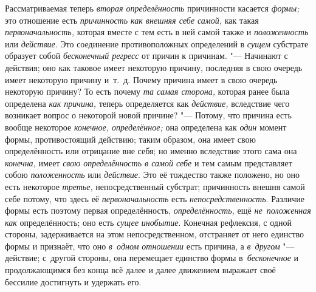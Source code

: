 Рассматриваемая теперь {\em вторая определённость} причинности касается
{\em формы;} это отношение есть {\em причинность как внешняя себе самой,} как
такая {\em первоначальность,} которая вместе с тем есть в ней самой также и
{\em положенность} или {\em действие}. Это соединение противоположных
определений в {\em сущем} субстрате образует собой {\em бесконечный регресс} от
причин к причинам. "--- Начинают с действия; оно как таковое имеет некоторую
причину, последняя в свою очередь имеет некоторую причину и~т.~д. Почему
причина имеет в свою очередь некоторую причину? То есть почему
{\em та самая сторона,} которая ранее была определена {\em как причина,} теперь
определяется как {\em действие,} вследствие чего возникает вопрос о некоторой
новой причине? "--- Потому, что причина есть вообще некоторое
{\em конечное, определённое;} она определена как {\em один} момент формы,
противостоящий действию; таким образом, она имеет свою определённость или
отрицание вне себя; но именно вследствие этого сама она {\em конечна,} имеет
{\em свою определённость в самой себе} и тем самым представляет собою
{\em положенность} или {\em действие}. Это её тождество также положено, но оно
есть некоторое {\em третье,} непосредственный субстрат; причинность внешня
самой себе потому, что здесь её {\em первоначальность} есть
{\em непосредственность}. Различие формы есть поэтому первая определённость,
{\em определённость,} ещё {\em не~положенная как} определённость; оно есть
{\em сущее инобытие}. Конечная рефлексия, с одной стороны, задерживается на
этом непосредственном, отстраняет от него единство формы и признаёт, что оно
{\em в~одном отношении} есть причина, а {\em в~другом} "--- действие;
с~другой стороны, она перемещает единство формы в~{\em бесконечное}
и продолжающимся без конца всё далее и далее движением
выражает своё бессилие достигнуть и удержать его.

